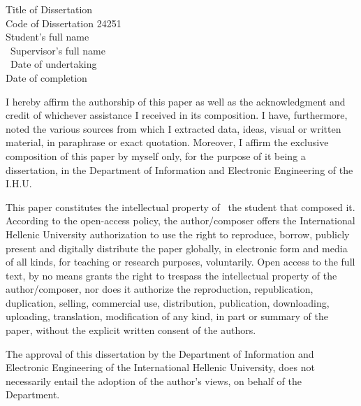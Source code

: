 \thispagestyle{empty} %

\vspace{3cm}

\begin{center}
Title of Dissertation \thesisTitle\\
Code of Dissertation 24251\\
Student’s full name \studentName\\\
Supervisor’s full name \supervisorName\\\
Date of undertaking \undertakingDate\\
Date of completion \completionDate\\
\end{center}

I hereby affirm the authorship of this paper as well as the acknowledgment and credit of whichever assistance I received in its composition. I have, furthermore, noted the various sources from which I extracted data, ideas, visual or written material, in paraphrase or exact quotation. Moreover, I affirm the exclusive composition of this paper by myself only, for the purpose of it being a dissertation, in the Department of Information and Electronic Engineering of the I.H.U.

This paper constitutes the intellectual property of \studentName\, the student that composed it. According to the open-access policy, the author/composer offers the International Hellenic University authorization to use the right to reproduce, borrow, publicly present and digitally distribute the paper globally, in electronic form and media of all kinds, for teaching or research purposes, voluntarily. Open access to the full text, by no means grants the right to trespass the intellectual property of the author/composer, nor does it authorize the reproduction, republication, duplication, selling, commercial use, distribution, publication, downloading, uploading, translation, modification of any kind, in part or summary of the paper, without the explicit written consent of the authors.

The approval of this dissertation by the Department of Information and Electronic Engineering of the International Hellenic University, does not necessarily entail the adoption of the author’s views, on behalf of the Department.